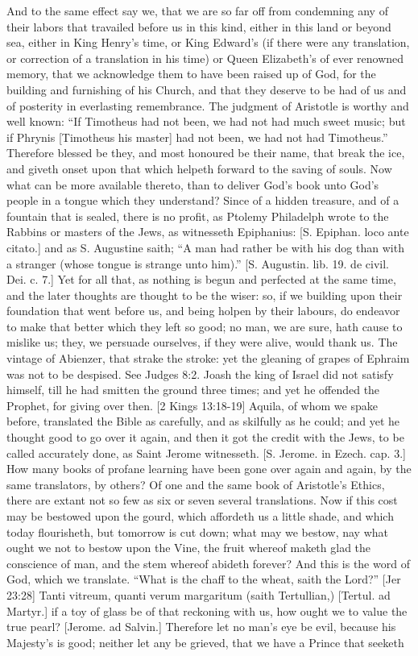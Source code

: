 {\par }{\IP And to the same effect say we, that we are so far off from condemning any of their labors that travailed before us in this kind, either in this land or beyond sea, either in King Henry’s time, or King Edward’s (if there were any translation, or correction of a translation in his time) or Queen Elizabeth’s of ever renowned memory, that we acknowledge them to have been raised up of God, for the building and furnishing of his Church, and that they deserve to be had of us and of posterity in everlasting remembrance. The judgment of Aristotle is worthy and well known: “If Timotheus had not been, we had not had much sweet music; but if Phrynis [Timotheus his master] had not been, we had not had Timotheus.” Therefore blessed be they, and most honoured be their name, that break the ice, and giveth onset upon that which helpeth forward to the saving of souls. Now what can be more available thereto, than to deliver God’s book unto God’s people in a tongue which they understand? Since of a hidden treasure, and of a fountain that is sealed, there is no profit, as Ptolemy Philadelph wrote to the Rabbins or masters of the Jews, as witnesseth Epiphanius: [S. Epiphan. loco ante citato.] and as S. Augustine saith; “A man had rather be with his dog than with a stranger (whose tongue is strange unto him).” [S. Augustin. lib. 19. de civil. Dei. c. 7.] Yet for all that, as nothing is begun and perfected at the same time, and the later thoughts are thought to be the wiser: so, if we building upon their foundation that went before us, and being holpen by their labours, do endeavor to make that better which they left so good; no man, we are sure, hath cause to mislike us; they, we persuade ourselves, if they were alive, would thank us. The vintage of Abienzer, that strake the stroke: yet the gleaning of grapes of Ephraim was not to be despised. See Judges 8:2. Joash the king of Israel did not satisfy himself, till he had smitten the ground three times; and yet he offended the Prophet, for giving over then. [2 Kings 13:18-19] Aquila, of whom we spake before, translated the Bible as carefully, and as skilfully as he could; and yet he thought good to go over it again, and then it got the credit with the Jews, to be called accurately done, as Saint Jerome witnesseth. [S. Jerome. in Ezech. cap. 3.] How many books of profane learning have been gone over again and again, by the same translators, by others? Of one and the same book of Aristotle’s Ethics, there are extant not so few as six or seven several translations. Now if this cost may be bestowed upon the gourd, which affordeth us a little shade, and which today flourisheth, but tomorrow is cut down; what may we bestow, nay what ought we not to bestow upon the Vine, the fruit whereof maketh glad the conscience of man, and the stem whereof abideth forever? And this is the word of God, which we translate. “What is the chaff to the wheat, saith the Lord?” [Jer 23:28] Tanti vitreum, quanti verum margaritum (saith Tertullian,) [Tertul. ad Martyr.] if a toy of glass be of that reckoning with us, how ought we to value the true pearl? [Jerome. ad Salvin.] Therefore let no man’s eye be evil, because his Majesty’s is good; neither let any be grieved, that we have a Prince that seeketh }
